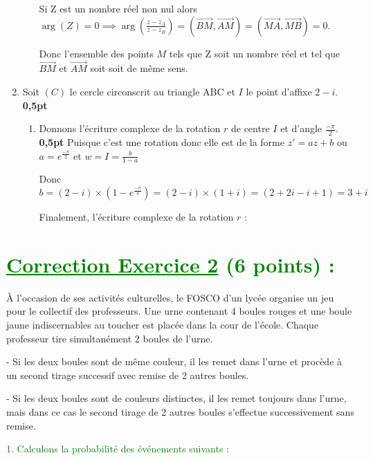 \documentclass[12pt]{article}
\begin{document}
\begin{enumerate}
\begin{enumerate}
		Si Z est un nombre réel non nul alors \\$ \arg(Z)=0\implies \arg(\frac{z-z_{A}}{z-z_{B}})=(\overrightarrow{BM},\overrightarrow{AM})=(\overrightarrow{MA},\overrightarrow{MB})=0$.
		
		Donc l’ensemble des points $M$ tels que Z soit un nombre réel et tel que $\overrightarrow{BM}$ et $ \overrightarrow{AM}$ soit soit de même sens.
  \end{enumerate}
   \item Soit $(C)$ le cercle circonscrit au triangle ABC et $I$ le point d’affixe $2 - i$.\textbf{ 0,5pt}
   \begin{enumerate}
     \item Donnons l’écriture complexe de la rotation $r$ de centre $I$ et d’angle $\frac{-\pi}{2}$.\textbf{ 0,5pt}
     Puisque c'est une rotation donc elle est de la forme $z'=az+b$ ou $a=e^{\frac{-\pi}{2}}$ et $w=I=\frac{b}{1-a}$
     
     Donc $b=(2 - i)\times (1-e^{\frac{-\pi}{2}})=(2 - i)\times (1+i)=(2 +2i-i+1)=3+i$
     
     Finalement, l’écriture complexe de la rotation $r$ :
     \textcolor{green}{}
   \end{enumerate}
\end{enumerate}
\section*{\textcolor{green}{\underline{Correction Exercice 2} (6 points) :}}
À l’occasion de ses activités culturelles, le FOSCO d’un lycée organise un jeu pour le collectif des professeurs. Une urne contenant 4 boules rouges et une boule jaune indiscernables au toucher est placée dans la cour de l’école. Chaque professeur tire simultanément 2 boules de l’urne.

- Si les deux boules sont de même couleur, il les remet dans l’urne et procède à un second tirage successif avec remise de 2 autres boules.

- Si les deux boules sont de couleurs distinctes, il les remet toujours dans l’urne, mais dans ce cas le second tirage de 2 autres boules s’effectue successivement sans remise.

\textcolor{green}{1. Calculons la probabilité des événements suivants :}
\end{document}
